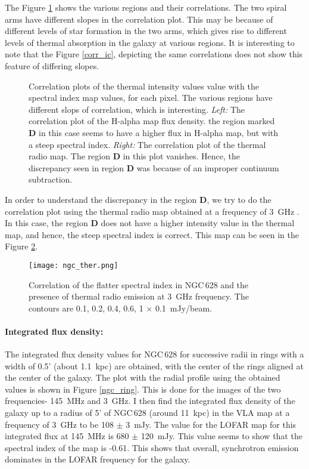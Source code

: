 \documentclass[../main/thesis_msc.tex]{subfiles}
\begin{document}
The Figure \ref{spectr} shows the various regions and their correlations. The two spiral arms have different slopes in the correlation plot. This may be because of different levels of star formation in the two arms, which gives rise to different levels of thermal absorption in the galaxy at various regions. It is interesting to note that the Figure \ref{corr_ic}, depicting the same correlations does not show this feature of differing slopes.
\begin{figure}
	\centering
	\caption{Correlation plots of the thermal intensity values value with the spectral index map values, for each pixel. The various regions have different slops of correlation, which is interesting. \textit{Left:} The correlation plot of the H-alpha map flux density. the region marked \textbf{D} in this case seems to have a higher flux in H-alpha map, but with a steep spectral index. \textit{Right:} The correlation plot of the thermal radio map. The region \textbf{D} in this plot vanishes. Hence, the discrepancy seen in region \textbf{D} was because of an improper continuum subtraction.}
\label{spectr}
\end{figure}


In order to understand the discrepancy in the region \textbf{D}, we try to do the correlation plot using the thermal radio map obtained at a frequency of 3~GHz \citep{2017A&A...600A...6M}. In this case, the region \textbf{D} does not have a higher intensity value in the thermal map, and hence, the steep spectral index is correct. This map can be seen in the Figure \ref{ngc_ther}. 

\begin{figure}
\centering
\texttt{[image: ngc\_ther.png]}
\caption{Correlation of the flatter spectral index in NGC\,628 and the presence of thermal radio emission at 3~GHz frequency. The contours are 0.1, 0.2, 0.4, 0.6, 1 $\times$ 0.1~mJy/beam.}
\label{ngc_ther}
\end{figure}



\paragraph{Integrated flux density:} The integrated flux density values for NGC\,628 for successive radii in rings with a width of 0.5' (about 1.1~kpc) are obtained, with the center of the rings aligned at the center of the galaxy. The plot with the radial profile using the obtained values is shown in Figure \ref{ngc_ring}. This is done for the images of the two frequencies- 145~MHz and 3~GHz. I then find the integrated flux density of the galaxy up to a radius of 5' of NGC\,628 (around 11~kpc) in the VLA map at a frequency of 3~GHz to be 108 $\pm$ 3~mJy. The value for the LOFAR map for this integrated flux at 145~MHz is 680 $\pm$ 120~mJy. This value seems to show that the spectral index of the map is -0.61. This shows that overall, synchrotron emission dominates in the LOFAR frequency for the galaxy. 
\end{document}
